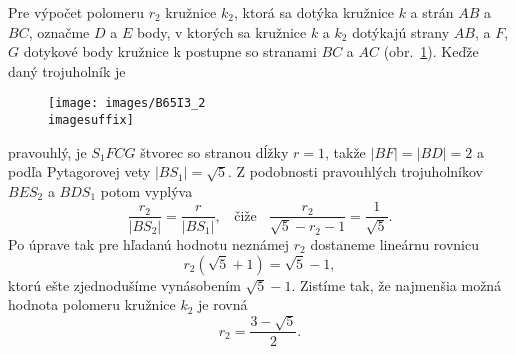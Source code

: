 {Pre výpočet polomeru $r_2$ kružnice $k_2$, ktorá sa dotýka kružnice $k$ a strán $AB$ a $BC$, označme $D$ a $E$ body, v ktorých sa kružnice $k$ a $k_2$ dotýkajú strany $AB$, a $F$, $G$ dotykové body kružnice k postupne so stranami $BC$ a $AC$ (obr.~\ref{fig:B65I3_2}). Keďže daný trojuholník je 
\begin{figure}[h]
    \centering
    \texttt{[image: images/B65I3\_2\\imagesuffix]}
    \caption{}
    \label{fig:B65I3_2}
\end{figure}
pravouhlý, je $S_1FCG$ štvorec so stranou dĺžky $r = 1$, takže $|BF| = |BD| = 2$ a podľa Pytagorovej vety $|BS_1| =\sqrt{5}$. Z podobnosti pravouhlých trojuholníkov $BES_2$ a $BDS_1$ potom vyplýva
$$\frac{r_2}{|BS_2|}=\frac{r}{|BS_1|}, \ \ \ \ \text{čiže} \ \ \ \ \frac{r_2}{\sqrt{5}- r_2 - 1}=\frac{1}{\sqrt{5}}.$$
Po úprave tak pre hľadanú hodnotu neznámej $r_2$ dostaneme lineárnu rovnicu
$$r_2(\sqrt{5} + 1) =\sqrt{5}-1,$$
ktorú ešte zjednodušíme vynásobením $\sqrt{5}-1$. Zistíme tak, že najmenšia možná hodnota polomeru kružnice $k_2$ je rovná $$r_2 = \frac{3-\sqrt{5}}{2}.$$
}
